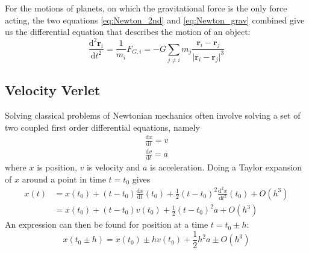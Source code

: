 \documentclass[reprint, english,notitlepage,nofootinbib]{revtex4-1}  %
\newcommand{\vc}[1]{\mathbf{#1}}
\begin{document}
For the motions of planets, on which the gravitational force is the only force acting, the two equations \eqref{eq:Newton_2nd} and \eqref{eq:Newton_grav} combined give us the differential equation that describes the motion of an object:
\begin{equation}
  \label{eq:DE}
  \frac{\mathrm d^2 \vc r_i}{\mathrm d t^2} = \frac{1}{m_i} F_{G, i} = - G \sum_{j \neq i} m_j \frac{\vc r_i - \vc r_j}{ \lvert \vc r_i - \vc r_j \rvert ^3}
\end{equation}


\subsection{Velocity Verlet}

Solving classical problems of Newtonian mechanics often involve solving a set of two coupled first order differential equations, namely
\begin{align*}
  \frac{\mathrm d x}{\mathrm dt} = v \\
  \frac{\mathrm d v}{\mathrm dt} = a
\end{align*}
where $x$ is position, $v$ is velocity and $a$ is acceleration. Doing a Taylor expansion of $x$ around a point in time $t = t_0$ gives
\begin{align*}
  x(t) &= x(t_0) + (t - t_0) \frac{\mathrm d x}{\mathrm dt}(t_0) + \frac{1}{2} (t - t_0)^2 \frac{\mathrm d^2 x}{\mathrm dt^2}(t_0) + O(h^3) \\
  &= x(t_0) + (t - t_0) v(t_0) + \frac{1}{2} (t - t_0)^2 a + O(h^3)
\end{align*}
An expression can then be found for position at a time $t = t_0 \pm h$:
\begin{equation}
  \label{eq:Taylor_exp_x}
  x(t_0 \pm h) = x(t_0) \pm h v(t_0) + \frac{1}{2} h^2 a \pm O(h^3)
\end{equation}
\end{document}
